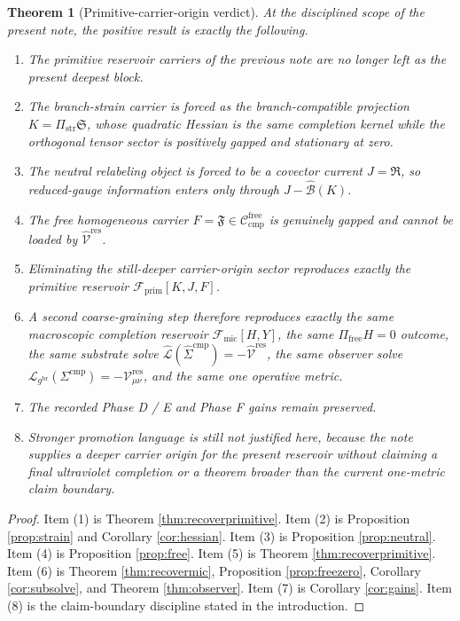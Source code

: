 \documentclass[11pt]{article}
\newcommand{\ObserverMetric}{g^{\mathrm{br}}}
\newcommand{\CompShift}{\Sigma^{\mathrm{cmp}}}
\newcommand{\CompLift}{\widehat\Sigma^{\mathrm{cmp}}}
\newcommand{\ResidualCore}{\mathcal V_{\mu\nu}^{\mathrm{res}}}
\newcommand{\ResidualLift}{\widehat{\mathcal V}^{\mathrm{res}}}
\newcommand{\SubGaugeVec}{\widehat{\mathcal B}}
\newcommand{\SubReducedEin}{\widehat{\mathcal L}}
\newcommand{\GaugeAux}{Y}
\newcommand{\ReducedEin}{\mathcal L_{\ObserverMetric}}
\newcommand{\CompFree}{\mathscr C_{\mathrm{cmp}}^{\mathrm{free}}}
\newcommand{\MicFunctional}{\mathscr F_{\mathrm{mic}}}
\newcommand{\PrimFunctional}{\mathscr F_{\mathrm{prim}}}
\newcommand{\PrimStrain}{K}
\newcommand{\PrimNeutral}{J}
\newcommand{\PrimFree}{F}
\newcommand{\CarrierProj}{\Pi_{\mathrm{str}}}
\newcommand{\CarrierSeed}{\mathfrak S}
\newcommand{\RelabelSeed}{\mathfrak R}
\newcommand{\FreeSeed}{\mathfrak F}
\newtheorem{theorem}{Theorem}
\begin{document}
\begin{theorem}[Primitive-carrier-origin verdict]
\label{thm:verdict}
At the disciplined scope of the present note, the positive result is exactly the following.
\begin{enumerate}
    \item The primitive reservoir carriers of the previous note are no longer left as the present deepest block.
    \item The branch-strain carrier is forced as the branch-compatible projection \(\PrimStrain=\CarrierProj\CarrierSeed\), whose quadratic Hessian is the same completion kernel while the orthogonal tensor sector is positively gapped and stationary at zero.
    \item The neutral relabeling object is forced to be a covector current \(\PrimNeutral=\RelabelSeed\), so reduced-gauge information enters only through \(\PrimNeutral-\SubGaugeVec(\PrimStrain)\).
    \item The free homogeneous carrier \(\PrimFree=\FreeSeed\in\CompFree\) is genuinely gapped and cannot be loaded by \(\ResidualLift\).
    \item Eliminating the still-deeper carrier-origin sector reproduces exactly the primitive reservoir \(\PrimFunctional[\PrimStrain,\PrimNeutral,\PrimFree]\).
    \item A second coarse-graining step therefore reproduces exactly the same macroscopic completion reservoir \(\MicFunctional[H,\GaugeAux]\), the same \(\Pi_{\mathrm{free}}H=0\) outcome, the same substrate solve \(\SubReducedEin(\CompLift)=-\ResidualLift\), the same observer solve \(\ReducedEin(\CompShift)=-\ResidualCore\), and the same one operative metric.
    \item The recorded Phase D / E and Phase F gains remain preserved.
    \item Stronger promotion language is still not justified here, because the note supplies a deeper carrier origin for the present reservoir without claiming a final ultraviolet completion or a theorem broader than the current one-metric claim boundary.
\end{enumerate}
\end{theorem}

\begin{proof}
Item (1) is Theorem \ref{thm:recoverprimitive}. Item (2) is Proposition \ref{prop:strain} and Corollary \ref{cor:hessian}. Item (3) is Proposition \ref{prop:neutral}. Item (4) is Proposition \ref{prop:free}. Item (5) is Theorem \ref{thm:recoverprimitive}. Item (6) is Theorem \ref{thm:recovermic}, Proposition \ref{prop:freezero}, Corollary \ref{cor:subsolve}, and Theorem \ref{thm:observer}. Item (7) is Corollary \ref{cor:gains}. Item (8) is the claim-boundary discipline stated in the introduction.
\end{proof}
\end{document}
